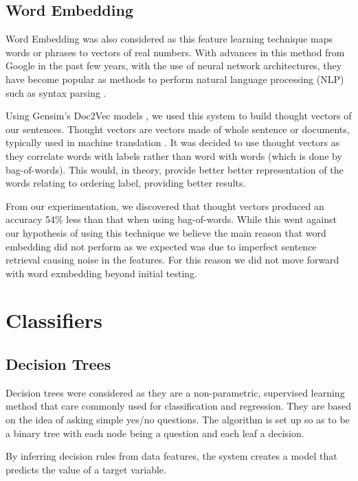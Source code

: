 \documentclass[bsc,frontabs,twoside,singlespacing,parskip,deptreport]{infthesis}     %
\begin{document}
\subsection{Word Embedding} \label{sec:word-embedding}
Word Embedding was also considered as this feature learning technique maps words or phrases to vectors of real numbers.
With advances in this method from Google in the past few years, with the use of neural network architectures, they have become
popular as methods to perform natural language processing (NLP) such as syntax parsing \cite{socher2013parsing}.

Using Gensim's Doc2Vec models \cite{rehurek_lrec}, we used this system to build thought vectors of our sentences.
Thought vectors are vectors made of whole sentence or documents, typically used in machine translation \cite{deeplearning4j}.
It was decided to use thought vectors as they correlate words with labels rather than word with words (which is done by bag-of-words).
This would, in theory, provide better better representation of the words relating to ordering label, providing better results.



From our experimentation, we discovered that thought vectors produced an accuracy 54\% less than that when
using bag-of-words. While this went against our hypothesis of using this technique we believe
the main reason that word embedding did not perform as we expected was due to imperfect sentence retrieval causing noise in
the features. For this reason we did not move forward with word exmbedding beyond initial testing.

\section{Classifiers}\label{sec:classifiers}
\subsection{Decision Trees}
Decision trees were considered as they are a non-parametric, supervised learning method that care commonly used for
classification and regression.
They are based on the idea of asking simple yes/no questions. The algorithm is set up so as to be a binary tree with
each node being a question and each leaf a decision.

By inferring decision rules from data features, the system creates a model that predicts the value of a target variable.
\end{document}
